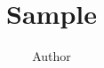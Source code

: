 \documentclass{article}
\begin{document}
\author{Author}
\title{Sample}
\maketitle












\printbibliography
\end{document}
